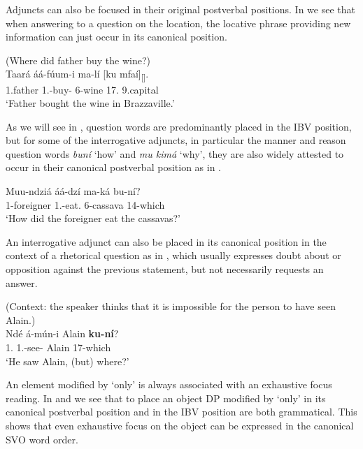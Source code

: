 \documentclass[output=paper,colorlinks,citecolor=brown,
]{langscibook}
\begin{document}
Adjuncts can also be focused in their original postverbal positions. In  we see that when answering to a question on the location, the locative phrase providing new information can just occur in its canonical position. 
\begin{exe} 
\ex
\label{6}
 (Where did father buy the wine?) \\
\gll
Taará áá-fúum-i ma-lí [ku mfaí]\textsubscript{[\FOC{}]}.\\
1.father 1\Sm{}.\Pst{}-buy-\Pst{} 6-wine {\db}17.\Loc{} 9.capital\\
\trans ‘Father bought the wine in Brazzaville.'

\end{exe}
As we will see in , question words are predominantly placed in the IBV position, but for some of the interrogative adjuncts, in particular the manner and reason question words \textit{bun\'{i}} `how' and \textit{mu kim\'{a}} `why', they are also widely attested to occur in their canonical postverbal position as in . 
\begin{exe} 
\ex
\label{7}
\gll
Muu-ndziá áá-dzí ma-ká bu-ní?\\
1-foreigner 1\Sm{}.\Pst{}-eat.\Pst{} 6-cassava 14-which\\
\trans ‘How did the foreigner eat the cassavas?'

\end{exe}
An interrogative adjunct can also be placed in its canonical position in the context of a rhetorical question as in , which usually expresses doubt about or opposition against the previous statement, but not necessarily requests an answer.
\begin{exe} 
\ex
\label{8}
 (Context: the speaker thinks that it is impossible for the person to have seen Alain.) \\
\gll
Ndé á-mún-i Alain \textbf{ku-ní}?\\
1.\Pro{} 1\Sm{}.\Pst{}-see-\Pst{} Alain 17-which\\
\trans ‘He saw Alain, (but) where?’

\end{exe}
An element modified by `only' is always associated with an exhaustive focus reading. In  and  we see that to place an object DP modified by `only' in its canonical postverbal position and in the IBV position are both grammatical. This shows that even exhaustive focus on the object can be expressed in the canonical SVO word order.
\end{document}

